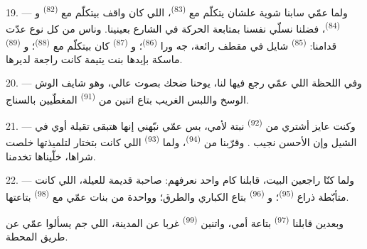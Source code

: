 19. --- ولما عمّي سابنا شوية علشان يتكلّم مع 
\textsuperscript{(83)}، اللي كان واقف بيتكلّم مع  \textsuperscript{(82)}
و \textsuperscript{(84)}، فضلنا نسلّي نفسنا بمتابعة الحركة في الشارع
بعينينا. وناس من كل نوع عدّت قدامنا:  \textsuperscript{(85)} شايل
في مقطف  رائعة، جه ورا  \textsuperscript{(86)}؛
و \textsuperscript{(87)} كان بيتكلّم مع 
\textsuperscript{(88)}؛ و \textsuperscript{(89)} ماسكة بإيدها بنت يتيمة
كانت راجعة لديرها.

\VUsaut{3.0mm}

20. --- وفي اللحظة اللي عمّي رجع فيها لنا، يوحنا ضحك بصوت عالي، وهو شايف الوش
الوسخ واللبس الغريب بتاع اتنين من  \textsuperscript{(91)}
المغطّيين بالسناج.

21. --- وكنت عايز أشتري من  \textsuperscript{(92)} نبتة لأمي، بس
عمّي نبّهني إنها هتبقى تقيلة أوي في الشيل وإن الأحسن نجيب . وقرّبنا
من  \textsuperscript{(94)}، ولما  \textsuperscript{(93)}
اللي كانت بتختار لتلميذتها خلصت شراها، خلّيناها تخدمنا.

22. --- ولما كنّا راجعين البيت، قابلنا كام واحد نعرفهم: صاحبة قديمة للعيلة، اللي
كانت متأبّطة ذراع  \textsuperscript{(95)}؛ و
\textsuperscript{(96)} بتاع الكباري والطرق؛ وواحدة من بنات عمّي مع 
\textsuperscript{(98)} بتاعتها.

وبعدين قابلنا  \textsuperscript{(97)} بتاعة أمي، واتنين
 \textsuperscript{(99)} غربا عن المدينة، اللي جم يسألوا عمّي عن طريق
المحطة.

\VUsaut{6.0mm}
\VUfilet{22mm}

